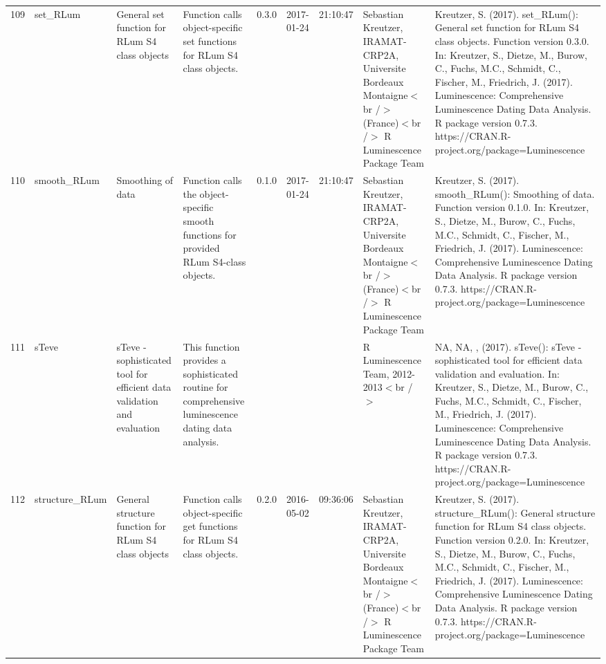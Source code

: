 \begin{table}[ht]
\begin{tabular}{rllllllll}
 \\ 
  109 & set\_RLum & General set function for RLum S4 class objects & Function calls object-specific set functions for RLum S4 class objects. & 0.3.0 & 2017-01-24 & 21:10:47
 & Sebastian Kreutzer, IRAMAT-CRP2A, Universite Bordeaux Montaigne$<$br /$>$ (France)$<$br /$>$  R Luminescence Package Team & Kreutzer, S. (2017). set\_RLum(): General set function for RLum S4 class objects. Function version 0.3.0. In: Kreutzer, S., Dietze, M., Burow, C., Fuchs, M.C., Schmidt, C., Fischer, M., Friedrich, J. (2017). Luminescence: Comprehensive Luminescence Dating Data Analysis. R package version 0.7.3. https://CRAN.R-project.org/package=Luminescence
 \\ 
  110 & smooth\_RLum & Smoothing of data & Function calls the object-specific smooth functions for provided RLum S4-class objects. & 0.1.0 & 2017-01-24 & 21:10:47
 & Sebastian Kreutzer, IRAMAT-CRP2A, Universite Bordeaux Montaigne$<$br /$>$ (France)$<$br /$>$  R Luminescence Package Team & Kreutzer, S. (2017). smooth\_RLum(): Smoothing of data. Function version 0.1.0. In: Kreutzer, S., Dietze, M., Burow, C., Fuchs, M.C., Schmidt, C., Fischer, M., Friedrich, J. (2017). Luminescence: Comprehensive Luminescence Dating Data Analysis. R package version 0.7.3. https://CRAN.R-project.org/package=Luminescence
 \\ 
  111 & sTeve & sTeve - sophisticated tool for efficient data validation and evaluation & This function provides a sophisticated routine for comprehensive luminescence dating data analysis. &  &  &  & R Luminescence Team, 2012-2013$<$br /$>$ & NA, NA, ,  (2017). sTeve(): sTeve - sophisticated tool for efficient data validation and evaluation. In: Kreutzer, S., Dietze, M., Burow, C., Fuchs, M.C., Schmidt, C., Fischer, M., Friedrich, J. (2017). Luminescence: Comprehensive Luminescence Dating Data Analysis. R package version 0.7.3. https://CRAN.R-project.org/package=Luminescence
 \\ 
  112 & structure\_RLum & General structure function for RLum S4 class objects & Function calls object-specific get functions for RLum S4 class objects. & 0.2.0 & 2016-05-02 & 09:36:06
 & Sebastian Kreutzer, IRAMAT-CRP2A, Universite Bordeaux Montaigne$<$br /$>$ (France)$<$br /$>$  R Luminescence Package Team & Kreutzer, S. (2017). structure\_RLum(): General structure function for RLum S4 class objects. Function version 0.2.0. In: Kreutzer, S., Dietze, M., Burow, C., Fuchs, M.C., Schmidt, C., Fischer, M., Friedrich, J. (2017). Luminescence: Comprehensive Luminescence Dating Data Analysis. R package version 0.7.3. https://CRAN.R-project.org/package=Luminescence

\end{tabular}
\end{table}
